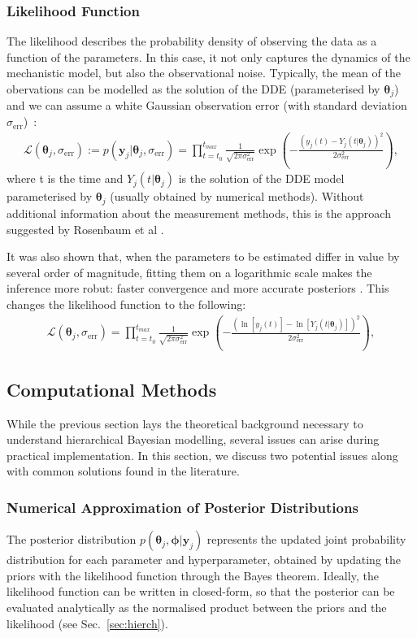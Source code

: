 \documentclass[11pt]{article}
\begin{document}
\subsubsection{Likelihood Function}
The likelihood describes the probability density of observing the data as a function of the parameters. In this case, it not only captures the dynamics of the mechanistic model, but also the observational noise. Typically, the mean of the obervations can be modelled as the solution of the DDE (parameterised by $\boldsymbol{\theta}_j$) and we can assume a white Gaussian observation error (with standard deviation $\sigma_\text{err}$)~\cite{liu_wang}\cite{likelihood_2}:
\begin{align*}
    \mathcal{L}(\boldsymbol{\theta}_j, \sigma_\text{err}) := p(\boldsymbol{y}_j | \boldsymbol{\theta}_j, \sigma_\text{err}) =  \prod_{t=t_0}^{t_{max}} \frac{1}{\sqrt{2\pi\sigma_\text{err}^2}} \exp\left(-\frac{(y_{j}(t) - Y_j(t|\boldsymbol{\theta}_j))^2}{2\sigma_\text{err}^2}\right),
\end{align*}
where t is the time and $Y_j(t|\boldsymbol{\theta}_j)$ is the solution of the DDE model parameterised by $\boldsymbol{\theta}_j$ (usually obtained by numerical methods). Without additional information about the measurement methods, this is the approach suggested by Rosenbaum et al \cite{rosenbaum}. 

It was also shown that, when the parameters to be estimated differ in value by several order of magnitude, fitting them on a logarithmic scale makes the inference more robut: faster convergence and more accurate posteriors \cite{rosenbaum}. This changes the likelihood function to the following:
\begin{align*}
    \mathcal{L}(\boldsymbol{\theta}_j, \sigma_\text{err}) = \prod_{t=t_0}^{t_{max}} \frac{1}{\sqrt{2\pi\sigma_\text{err}^2}} \exp\left(-\frac{(\ln[y_{j}(t)] - \ln[Y_j(t|\boldsymbol{\theta}_j)])^2}{2\sigma_\text{err}^2}\right),
\end{align*}

\subsection{Computational Methods}
While the previous section lays the theoretical background necessary to understand hierarchical Bayesian modelling, several issues can arise during practical implementation. In this section, we discuss two potential issues along with common solutions found in the literature.
\subsubsection{Numerical Approximation of Posterior Distributions}\label{sec:mcmc}
The posterior distribution $p(\boldsymbol{\theta}_j,\boldsymbol{\phi}|\boldsymbol{y}_j)$ represents the updated joint probability distribution for each parameter and hyperparameter, obtained by updating the priors with the likelihood function through the Bayes theorem. Ideally, the likelihood function can be written in closed-form, so that the posterior can be evaluated analytically as the normalised product between the priors and the likelihood (see Sec.~\ref{sec:hierch}).
\end{document}
